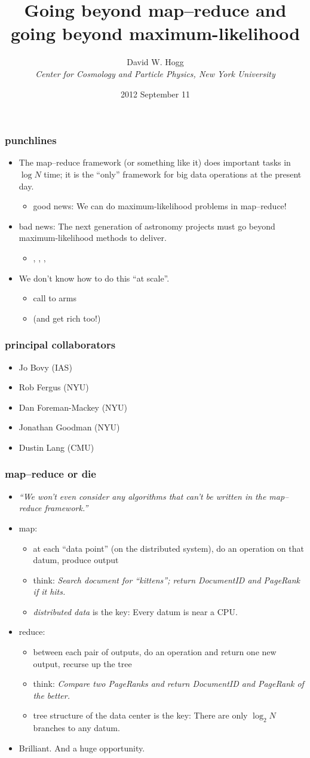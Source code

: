 \documentclass[pdftex]{beamer}
\title{Going beyond map--reduce and \\ going beyond maximum-likelihood}
\author[David W. Hogg (NYU)]{David W. Hogg \\
  \textsl{\small Center for Cosmology and Particle Physics,
                 New York University}}
\date{2012 September 11}
\newcommand{\conclusion}{
\begin{frame}
  \frametitle{punchlines}
  \begin{itemize}
  \item The map--reduce framework (or something like it) does
    important tasks in $\log N$ time; it is the ``only'' framework
    for big data operations at the present day.
    \begin{itemize}
    \item good news: We can do maximum-likelihood problems in map--reduce!
    \end{itemize}
  \item bad news:  The next generation of astronomy projects must go beyond
    maximum-likelihood methods to deliver.
    \begin{itemize}
    \item \gaia, \lsst, \euclid, \etc
    \end{itemize}
  \item We don't know how to do this ``at scale''.
    \begin{itemize}
    \item call to arms
    \item (and get rich too!)
    \end{itemize}
  \end{itemize}
\end{frame}
}
\begin{document}
\begin{frame}
  \titlepage
\end{frame}

\conclusion

\begin{frame}
  \frametitle{principal collaborators}
  \begin{itemize}
  \item Jo Bovy (IAS)
  \item Rob Fergus (NYU)
  \item Dan Foreman-Mackey (NYU)
  \item Jonathan Goodman (NYU)
  \item Dustin Lang (CMU)
  \end{itemize}
\end{frame}

\begin{frame}
  \frametitle{map--reduce or die}
  \begin{itemize}
  \item \emph{``We won't even consider any algorithms that can't be
    written in the map--reduce framework.''}
  \item map:
    \begin{itemize}
    \item at each ``data point'' (on the distributed system), do an
      operation on that datum, produce output
    \item think: \emph{Search document for ``kittens''; return
      DocumentID and PageRank if it hits.}
    \item \emph{distributed data} is the key: Every datum is near a
      CPU.
    \end{itemize}
  \item reduce:
    \begin{itemize}
    \item between each pair of outputs, do an operation and return one
      new output, recurse up the tree
    \item think: \emph{Compare two PageRanks and return DocumentID and
      PageRank of the better.}
    \item tree structure of the data center is the key: There are only
      $\log_2 N$ branches to any datum.
    \end{itemize}
  \item Brilliant.  And a huge opportunity.
  \end{itemize}
\end{frame}
\end{document}
